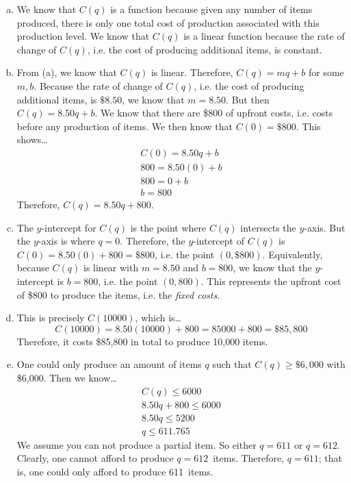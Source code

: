 \documentclass[11pt,letterpaper]{article}
\begin{document}
\sol 
\begin{enumerate}[(a)]
\item We know that $C(q)$ is a function because given any number of items produced, there is only one total cost of production associated with this production level. We know that $C(q)$ is a linear function because the rate of change of $C(q)$, i.e. the cost of producing additional items, is constant. \pspace

\item From (a), we know that $C(q)$ is linear. Therefore, $C(q)= mq + b$ for some $m, b$. Because the rate of change of $C(q)$, i.e. the cost of producing additional items, is $\$8.50$, we know that $m= 8.50$. But then $C(q)= 8.50q + b$. We know that there are \$800 of upfront costs, i.e. costs before any production of items. We then know that $C(0)= \$800$. This shows\dots
	\[
	\begin{gathered}
	C(0)= 8.50q + b \\
	800= 8.50(0) + b \\
	800= 0 + b \\
	b= 800
	\end{gathered}
	\]
Therefore, $C(q)= 8.50q + 800$. \pspace

\item The $y$-intercept for $C(q)$ is the point where $C(q)$ intersects the $y$-axis. But the $y$-axis is where $q= 0$. Therefore, the $y$-intercept of $C(q)$ is $C(0)= 8.50(0) + 800= \$800$, i.e. the point $(0, \$800)$. Equivalently, because $C(q)$ is linear with $m= 8.50$ and $b= 800$, we know that the $y$-intercept is $b= 800$, i.e. the point $(0, 800)$. This represents the upfront cost of \$800 to produce the items, i.e. the \textit{fixed costs}. \pspace

\item This is precisely $C(10000)$, which is\dots
	\[
	C(10000)= 8.50(10000) + 800= 85000 + 800= \$85,\!800
	\]
Therefore, it costs \$85,800 in total to produce 10,000 items. \pspace

\item One could only produce an amount of items $q$ such that $C(q) \geq \$6,\!000$ with \$6,000. Then we know\dots
	\[
	\begin{gathered}
	C(q) \leq 6000 \\
	8.50q + 800 \leq 6000 \\
	8.50q \leq 5200 \\
	q \leq 611.765
	\end{gathered}
	\]
We assume you can not produce a partial item. So either $q= 611$ or $q= 612$. Clearly, one cannot afford to produce $q=612$~items. Therefore, $q= 611$; that is, one could only afford to produce 611~items. 
\end{enumerate}
\end{document}
